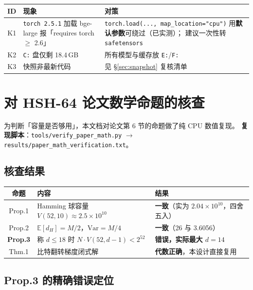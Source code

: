 \documentclass[11pt,a4paper]{ctexart}
\newcommand{\warn}[1]{\textcolor{warnred}{\textbf{#1}}}
\newcommand{\ok}[1]{\textcolor{okgreen}{\textbf{#1}}}
\theoremstyle{definition}
\begin{document}
\begin{center}
\begin{tabularx}{\textwidth}{@{}clX@{}}
\toprule
\textbf{ID} & \textbf{现象} & \textbf{对策} \\
\midrule
K1 & \texttt{torch 2.5.1} 加载 bge-large 报「requires torch $\ge$ 2.6」 &
\texttt{torch.load(..., map\_location="cpu")} 用\textbf{默认参数}可绕过（已实测）；
建议一次性转 \texttt{safetensors} \\
K2 & \texttt{C:} 盘仅剩 18.4\,GB & 所有模型与缓存放 \texttt{E:}/\texttt{F:} \\
K3 & 快照非最新代码 & 见 \S\ref{sec:snapshot} 复核清单 \\
\bottomrule
\end{tabularx}
\end{center}

\section{对 HSH-64 论文数学命题的核查}\label{sec:prop3}

为判断「容量是否够用」，本文档对论文第 6 节的命题做了纯 CPU 数值复现。
\textbf{复现脚本}：\texttt{tools/verify\_paper\_math.py} $\to$ \texttt{results/paper\_math\_verification.txt}。

\subsection{核查结果}

\begin{center}
\begin{tabularx}{\textwidth}{@{}clX@{}}
\toprule
\textbf{命题} & \textbf{内容} & \textbf{结果} \\
\midrule
Prop.1 & Hamming 球容量 $V(52,10)\approx2.5\times10^{10}$ & \ok{一致}（实为 $2.04\times10^{10}$，四舍五入） \\
Prop.2 & $\mathbb{E}[d_H]=M/2$，$\mathrm{Var}=M/4$ & \ok{一致}（26 与 3.6056） \\
\textbf{Prop.3} & 称 $d\le18$ 时 $N\cdot V(52,d-1)<2^{52}$ & \warn{错误，实际最大 $d=14$} \\
Thm.1 & 比特翻转梯度闭式解 & \ok{代数正确}，本设计直接复用 \\
\bottomrule
\end{tabularx}
\end{center}

\subsection{Prop.3 的精确错误定位}
\end{document}
